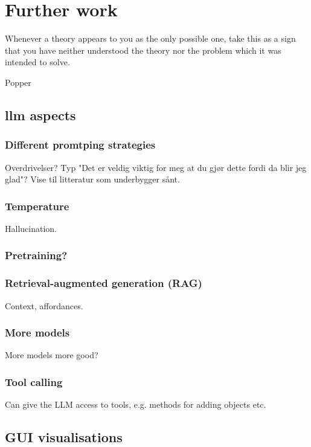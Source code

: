 \chapter{Further work}\label{sec:furtherWork}

\epigraph{Whenever a theory appears to you as the only possible one, take this as a sign that you have neither understood the theory nor the problem which it was intended to solve.}{Popper}

\section{\acrshort{llm} aspects}

\subsection{Different promtping strategies}

Overdrivelser? Typ "Det er veldig viktig for meg at du gjør dette fordi da blir
jeg glad"? Vise til litteratur som underbygger sånt.

\subsection{Temperature}
Hallucination.

\subsection{Pretraining?}

\subsection{Retrieval-augmented generation (RAG)}
Context, affordances.

\subsection{More models}

More models more good?

\subsection{Tool calling}

Can give the LLM access to tools, e.g. methods for adding objects etc.

\section{GUI visualisations}

